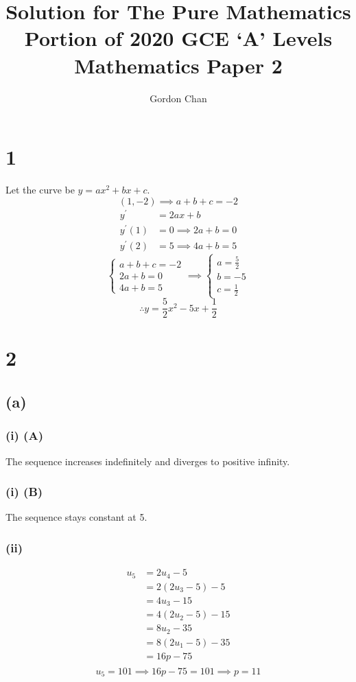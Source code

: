 \documentclass[a4paper,12pt]{article}
\author{Gordon Chan}
\title{Solution for The Pure Mathematics Portion of 2020 GCE `A' Levels Mathematics Paper 2}
\begin{document}
\maketitle

\section*{1}
Let the curve be \(y=ax^2+bx+c\).
\[(1,-2)\implies a+b+c=-2\]
\[\begin{aligned}
    y^\prime&=2ax+b\\
    y^\prime(1)&=0\implies2a+b=0\\
    y^\prime(2)&=5\implies 4a+b=5
\end{aligned}\]
\[\begin{cases}
    a+b+c=-2\\
    2a+b=0\\
    4a+b=5
\end{cases}
\implies
\begin{cases}
    a=\frac52\\
    b=-5\\
    c=\frac12
\end{cases}\]
\[\therefore\boxed{y=\frac52x^2-5x+\frac12}\]

\section*{2}
\subsection*{(a)}
\subsubsection*{(i) (A)}
The sequence increases indefinitely and diverges to positive infinity.
\subsubsection*{(i) (B)}
The sequence stays constant at 5.
\subsubsection*{(ii)}
\[\begin{aligned}
    u_5&=2u_4-5\\
       &=2(2u_3-5)-5\\
       &=4u_3-15\\
       &=4(2u_2-5)-15\\
       &=8u_2-35\\
       &=8(2u_1-5)-35\\
       &=16p-75\\
\end{aligned}\]
\[u_5=101\implies 16p-75=101\implies p=\boxed{11}\]
\end{document}

